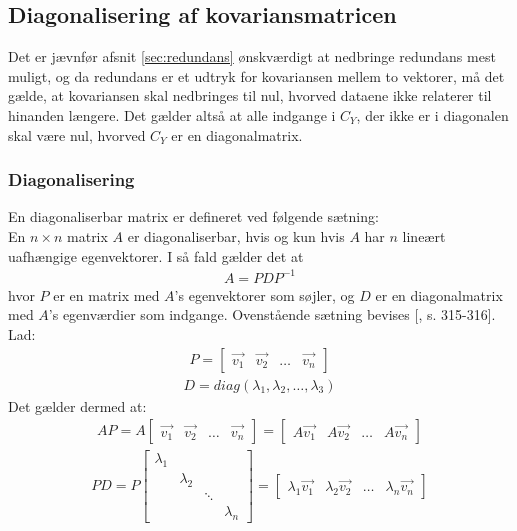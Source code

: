 \subsection{Diagonalisering af kovariansmatricen}
Det er jævnfør afsnit \vref{sec:redundans} ønskværdigt at nedbringe redundans mest muligt, og da redundans er et udtryk for kovariansen mellem to vektorer, må det gælde, at kovariansen skal nedbringes til nul, hvorved dataene ikke relaterer til hinanden længere. Det gælder altså at alle indgange i $C_Y$, der ikke er i diagonalen skal være nul, hvorved $C_Y$ er en diagonalmatrix.

\subsubsection{Diagonalisering} \label{sec:diagonalisering}
En diagonaliserbar matrix er defineret ved følgende sætning:\\
En $n \times n$ matrix $A$ er diagonaliserbar, hvis og kun hvis $A$ har $n$ lineært uafhængige egenvektorer. I så fald gælder det at
\begin{align}
A = PDP^{-1}
\label{eq:diagonalisering}
\end{align}
hvor $P$ er en matrix med $A$'s egenvektorer som søjler, og $D$ er en diagonalmatrix med $A$'s egenværdier som indgange.
Ovenstående sætning bevises [\citet{linalg}, s. 315-316]. Lad:
\begin{align*} P = \begin{bmatrix} \vec{v_1} & \vec{v_2} & \hdots & \vec{v_n} \end{bmatrix} \end{align*}
\begin{align*} D = diag(\lambda_1, \lambda_2, …, \lambda_3) \end{align*}
Det gælder dermed at:
\begin{align*} AP = A\begin{bmatrix} \vec{v_1} & \vec{v_2} & \hdots & \vec{v_n} \end{bmatrix} = \begin{bmatrix} A\vec{v_1} & A\vec{v_2} & \hdots & A\vec{v_n} \end{bmatrix} \end{align*}
\begin{align*} PD = P\begin{bmatrix}
\lambda_1			\\
&	\lambda_2		\\
&&	\ddots			\\
&&&	\lambda_n
\end{bmatrix} = \begin{bmatrix} \lambda_1\vec{v_1} & \lambda_2\vec{v_2} & \hdots & \lambda_n\vec{v_n} \end{bmatrix} \end{align*}
